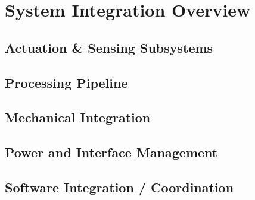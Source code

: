 \section{System Integration Overview}

\subsection{Actuation \& Sensing Subsystems}

\subsection{Processing Pipeline}

\subsection{Mechanical Integration}

\subsection{Power and Interface Management}

\subsection{Software Integration / Coordination}
